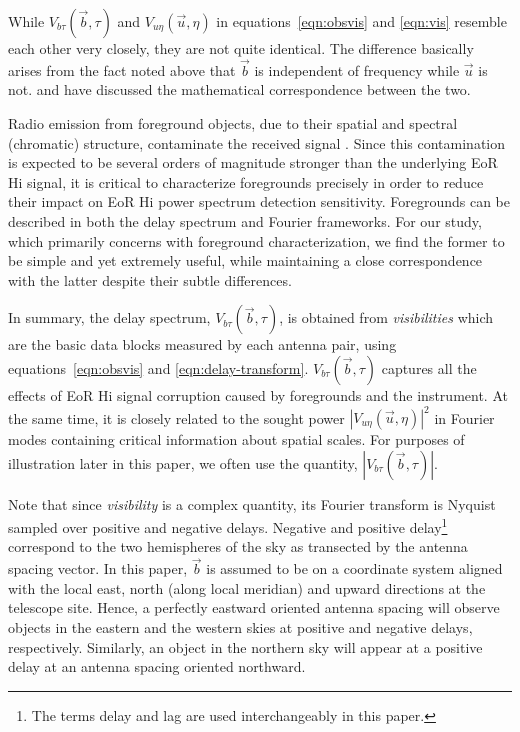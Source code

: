 \documentclass[preprint2,iop,numberedappendix]{emulateapj}
\begin{document}
While $V_{b\tau}(\vec{b},\tau)$ and $V_{u\eta}(\vec{u},\eta)$ in equations~\ref{eqn:obsvis} and \ref{eqn:vis} resemble each other very closely, they are not quite identical. The difference basically arises from the fact noted above that $\vec{b}$ is independent of frequency while $\vec{u}$ is not. \citet{par12} and \citet{liu14a} have discussed the mathematical correspondence between the two. 

Radio emission from foreground objects, due to their spatial and spectral (chromatic) structure, contaminate the received signal \citep{bow09,dat10,mor12,tro12,thy13,liu14a,liu14b}. Since this contamination is expected to be several orders of magnitude stronger than the underlying EoR H{\sc i} signal, it is critical to characterize foregrounds precisely in order to reduce their impact on EoR H{\sc i} power spectrum detection sensitivity. Foregrounds can be described in both the delay spectrum and Fourier frameworks. For our study, which primarily concerns with foreground characterization, we find the former to be simple and yet extremely useful, while maintaining a close correspondence with the latter despite their subtle differences. 

In summary, the delay spectrum, $V_{b\tau}(\vec{b},\tau)$, is obtained from {\it visibilities} which are the basic data blocks measured by each antenna pair, using equations~\ref{eqn:obsvis} and \ref{eqn:delay-transform}. $V_{b\tau}(\vec{b},\tau)$ captures all the effects of EoR H{\sc i} signal corruption caused by foregrounds and the instrument. At the same time, it is closely related to the sought power $|V_{u\eta}(\vec{u},\eta)|^2$ in Fourier modes containing critical information about spatial scales. For purposes of illustration later in this paper, we often use the quantity, $|V_{b\tau}(\vec{b},\tau)|$.

Note that since {\it visibility} is a complex quantity, its Fourier transform is Nyquist sampled over positive and negative delays. Negative and positive delay\footnote{The terms delay and lag are used interchangeably in this paper.} correspond to the two hemispheres of the sky as transected by the antenna spacing vector. In this paper, $\vec{b}$ is assumed to be on a coordinate system aligned with the local east, north (along local meridian) and upward directions at the telescope site. Hence, a perfectly eastward oriented antenna spacing will observe objects in the eastern and the western skies at positive and negative delays, respectively. Similarly, an object in the northern sky will appear at a positive delay at an antenna spacing oriented northward.
\end{document}
